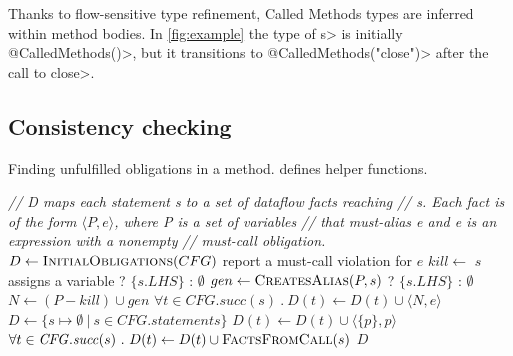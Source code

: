 Thanks to flow-sensitive type refinement,
Called Methods types are inferred within method bodies.
In \cref{fig:example} the type of \<s> is initially \<@CalledMethods({})>,
but it transitions to \<@CalledMethods("close")> after the call to \<close>.


\subsection{Consistency checking}
\label{sec:must-call-invoked}

\begin{algorithm}[t]
  \caption{Finding unfulfilled \MustCall obligations in a method.
     defines helper functions.}
  \label{alg:consistency-checker}
  \begin{algorithmic}[1]
  \State \textit{// D maps each statement s to a set of dataflow facts reaching}
  \State \textit{// s.  Each fact is of the form $\langle P, e \rangle$, where P is a set of variables}
  \State \textit{// that must-alias e and e is an expression with a nonempty}
  \State \textit{// must-call obligation.}
  \State $D \gets \textsc{InitialObligations}(CFG)$ \label{li:call-initial-obs}
     \label{li:end-scope}
      \State report a must-call violation for $e$
     \label{li:check-satisfied}
    \State $kill \gets $ $s$ assigns a variable ? $\{s.LHS\}$ : $\emptyset$ \label{li:compute-kill}
    \State $gen \gets \textsc{CreatesAlias}(P,s)$ ? $\{s.LHS\}$ : $\emptyset$ \label{li:compute-gen} 
    \State $N \gets (P - kill) \cup gen$ \label{li:compute-new-mc-aliases}
    \State $\forall t \in \mathit{CFG.succ}(s)\ .\ D(t) \leftarrow D(t) \cup \langle
    N, e \rangle$ \label{li:prop-to-succs}
    \EndIf
    \EndFor
  \EndWhile \label{li:alg-loop-end}
  \EndProcedure
  \State $D \gets \{ s \mapsto \emptyset\ |\ s \in \mathit{CFG.statements} \}$\label{li:start-init}
  \label{li:init-formals}
      \State $D(t) \gets D(t) \cup \langle \{p\}, p \rangle$
    \EndIf
  \EndFor \label{li:end-init-formals}
   \label{li:init-calls}
    \State $\forall t \in \mathit{CFG.succ}(s)\ .\ D(t) \leftarrow D(t) \cup \textsc{FactsFromCall}(s)$
  \EndFor  \label{li:end-init}
  \State \Return $D$
  \EndProcedure
  \end{algorithmic}
\end{algorithm}

